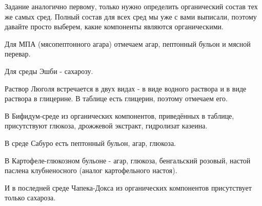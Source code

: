 \newpage

\explanationSection

Задание аналогично первому, только нужно определить органический состав тех же самых сред. Полный состав для всех сред мы уже с вами выписали, поэтому давайте просто выберем, какие компоненты являются органическими.

Для МПА (мясопептонного агара) отмечаем агар, пептонный бульон и мясной перевар.

Для среды Эшби - сахарозу.

Раствор Люголя встречается в двух видах - в виде водного раствора и в виде раствора в глицерине. В таблице есть глицерин, поэтому отмечаем его.

В Бифидум-среде из органических компонентов, приведённых в таблице, присутствуют глюкоза, дрожжевой экстракт, гидролизат казеина. 

В среде Сабуро есть пептонный бульон, агар, глюкоза.

В Картофеле-глюкозном бульоне - агар, глюкоза, бенгальский розовый, настой паслена клубненосного (аналог картофельного настоя).

И в последней среде Чапека-Докса из органических компонентов присутствует только сахароза.

